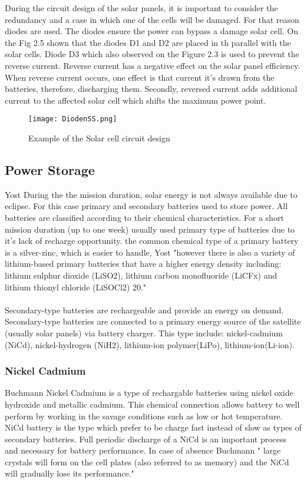 During the circuit design of the solar panels, it is important to consider the redundancy and a case in which one of the cells will be damaged. For that reason diodes are used. The diodes ensure the power can bypass a damage solar cell. On the Fig 2.5 shown that the diodes D1 and D2 are placed in th parallel with the solar cells. Diode D3 which also observed on the Figure 2.3 is used to prevent the reverse current. Reverse current has a negative effect on the solar panel efficiency. When reverse current occurs, one effect is that current it's drawn from the batteries, therefore, discharging them. Secondly, reversed current adds additional current to the affected solar cell which shifts the maximum power point.\\


\begin{figure}[h]
	\centering
	\texttt{[image: DiodenSS.png]}
	\caption{ Example of the Solar cell circuit design}
	\label{
		: EPS}
\end{figure}
 
\newpage


\subsection{Power Storage \label{sec:tech1}}



Yost\cite{1} During the the mission duration, solar energy is not always available due to eclipse. For this case primary and secondary batteries used to store power. All batteries are classified according to their chemical characteristics. For a short mission duration (up to one week) usually used primary type of batteries due to it's lack of recharge opportunity. the common chemical type of a primary battery is a silver-zinc, which is easier to handle, Yost\cite{1} "however there is also a variety of lithium-based primary batteries that have a higher energy density including: lithium sulphur dioxide (LiSO2), lithium carbon monofluoride (LiCFx) and lithium thionyl chloride (LiSOCl2) 20."\\
\\
Secondary-type batteries are rechargeable and provide an energy on demand. Secondary-type batteries are connected to a primary energy source of the satellite (usually solar panels) via battery charger. This type include: nickel-cadmium (NiCd), nickel-hydrogen (NiH2), lithium-ion polymer(LiPo), lithium-ion(Li-ion).
\subsubsection{Nickel Cadmium \label{sec:tech}}
 Buchmann\cite{7} Nickel Cadmium is a type of rechargable batteries using nickel oxide hydroxide and metallic cadmium. This chemical connection allows battery to well perform by working in the savage conditions such as low or hot temperature. NiCd battery is the type which prefer to be charge fast instead of slow as types of secondary batteries. Full periodic discharge of a NiCd is an important process and necessary for battery performance. In case of absence  Buchmann\cite{7} " large crystals will form on the cell plates (also referred to as memory) and the NiCd will gradually lose its performance."
 
